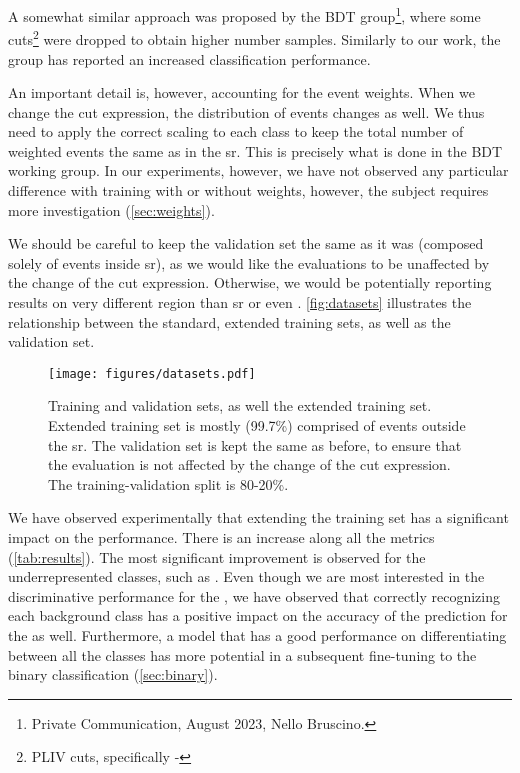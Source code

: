 A somewhat similar approach was proposed by the BDT group\footnote{Private Communication, August 2023, Nello Bruscino.},
where some cuts\footnote{PLIV cuts, specifically - } were dropped to obtain
higher number \ttbar samples. Similarly to our work, the group has reported an increased classification performance.

An important detail is, however, accounting for the event weights. When we change the cut expression, the distribution
of events changes as well. We thus need to apply the correct scaling to each class to keep the total number of weighted
events the same as in the \gls{sr}. This is precisely what is done in the BDT working group.
In our experiments, however, we have not observed any particular difference with training with or without weights,
however, the subject requires more investigation (\autoref{sec:weights}).

We should be careful to keep the validation set the same as it was (composed solely of events inside
\gls{sr}), as we would like the evaluations to be unaffected by the change of the cut expression. Otherwise, we would be
potentially reporting results on very different region than \gls{sr} or even \lss. \autoref{fig:datasets} illustrates
the relationship between the standard, extended training sets, as well as the validation set.



\begin{figure}[htbp]
    \centering
    \texttt{[image: figures/datasets.pdf]}
    \caption[Training and validation sets, as well the extended training set.]
    {Training and validation sets, as well the extended training set. Extended training set is mostly (99.7\%)
        comprised of events outside the \gls{sr}. The validation set is kept the same as before, to ensure that the
        evaluation is not affected by the change of the cut expression. The training-validation split is 80-20\%.}
    \label{fig:datasets}
\end{figure}

We have observed experimentally that extending the training set has a significant impact on the performance. There is an
increase along all the metrics (\autoref{tab:results}). The most significant improvement is observed for the
underrepresented classes, such as \ttbar. Even though we are most interested in the discriminative performance for the
\tth, we have observed that correctly recognizing each background class has a positive impact on the accuracy of the
prediction for the \tth as well. Furthermore, a model that has a  good performance on differentiating between all the
classes has more potential in a subsequent fine-tuning to the binary classification (\autoref{sec:binary}).